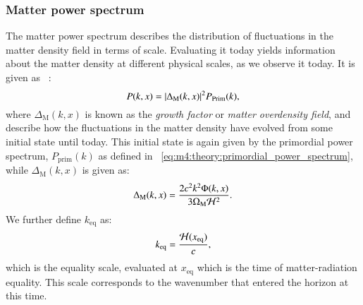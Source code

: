     \subsubsection{Matter power spectrum}
        The matter power spectrum describes the distribution of fluctuations in the matter density field in terms of scale. Evaluating it today yields information about the matter density at different physical scales, as we observe it today. It is given as ~\cite{AST5220LectureNotes}:
        \begin{equation}\label{eq:m4:theory:matter_power_spectrum}
            P(k,x) = \abs{\Delta_\mathrm{M}(k,x)}^2P_\mathrm{Prim}(k),
        \end{equation}
        where $\Delta_\mathrm{M}(k,x)$ is known as the \textit{growth factor} or \textit{matter overdensity field}, and describe how the fluctuations in the matter density have evolved from some initial state until today. This initial state is again given by the primordial power spectrum, $P_\mathrm{prim}(k)$ as defined in ~\cref{eq:m4:theory:primordial_power_spectrum}, while $\Delta_\mathrm{M}(k,x)$ is given as:
        \begin{equation}\label{eq:m4:theory:growth_factor}
            \Delta_\mathrm{M}(k,x) = \frac{2c^2k^2\Phi(k,x)}{3\Omega_\mathrm{M}\mathcal{H}^2}.
        \end{equation}
        We further define $k_\mathrm{eq}$ as:
        \begin{equation}\label{eq:m4:theory:mps_keq}
            k_\mathrm{eq} = \frac{\mathcal{H}(x_\mathrm{eq})}{c},
        \end{equation}
        which is the equality scale, evaluated at $x_\mathrm{eq}$ which is the time of matter-radiation equality. This scale corresponds to the wavenumber that entered the horizon at this time. 
